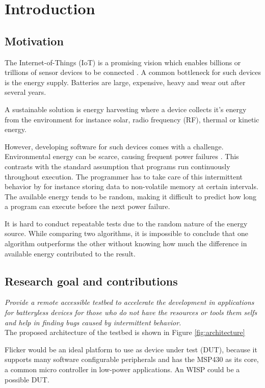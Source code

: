 \chapter{Introduction}
\label{chp:introduction}

\section{Motivation}
The Internet-of-Things (IoT) is a promising vision which enables billions or trillions of sensor devices to be connected \cite{flicker}. A common bottleneck for such devices is the energy supply. Batteries are large, expensive, heavy and wear out after several years.  %

A sustainable solution is energy harvesting where a device collects it's energy from the environment for instance solar, radio frequency (RF), thermal or kinetic energy.

However, developing software for such devices comes with a challenge. Environmental energy can be scarce, causing frequent power failures \cite{tpcthesis}. This contrasts with the standard assumption that programs run continuously throughout execution. The programmer has to take care of this intermittent behavior by for instance storing data to non-volatile memory at certain intervals. The available energy tends to be random, making it difficult to predict how long a program can execute before the next power failure. 

It is hard to conduct repeatable tests due to the random nature of the energy source. While comparing two algorithms, it is impossible to conclude that one algorithm outperforms the other without knowing how much the difference in available energy contributed to the result.

\section{Research goal and contributions}

\textit{Provide a remote accessible testbed to accelerate the development in applications for batteryless devices for those who do not have the resources or tools them selfs and help in finding bugs caused by intermittent behavior.}\\

The proposed architecture of the testbed is shown in Figure \ref{fig:architecture}

Flicker \cite{flicker} would be an ideal platform to use as device under test (DUT), because it supports many software configurable peripherals and has the MSP430 as its core, a common micro controller in low-power applications. An WISP \cite{wisp} could be a possible DUT.

